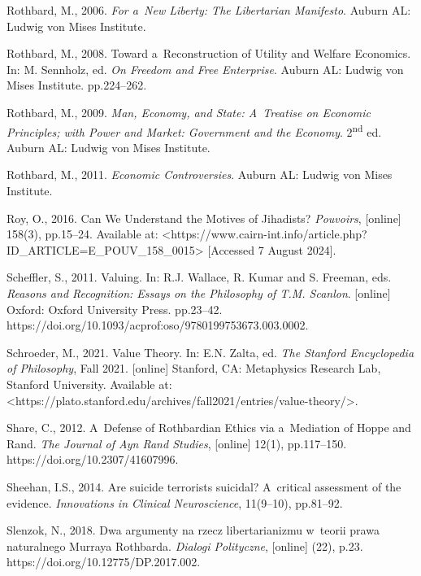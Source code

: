Rothbard, M., 2006. \textit{For a~New Liberty: The Libertarian Manifesto}. Auburn AL: Ludwig von Mises Institute.



Rothbard, M., 2008. Toward a~Reconstruction of Utility and Welfare Economics. In: M. Sennholz, ed. \textit{On Freedom and Free Enterprise}. Auburn AL: Ludwig von Mises Institute. pp.224–262.



Rothbard, M., 2009. \textit{Man, Economy, and State: A~Treatise on Economic Principles; with Power and Market: Government and the Economy}. 2\textsuperscript{nd} ed. Auburn AL: Ludwig von Mises Institute.



Rothbard, M., 2011. \textit{Economic Controversies}. Auburn AL: Ludwig von Mises Institute.



Roy, O., 2016. Can We Understand the Motives of Jihadists? \textit{Pouvoirs}, [online] 158(3), pp.15–24. Available at: {\textless}https://www.cairn-int.info/article.php?ID\_ARTICLE=E\_POUV\_158\_0015{\textgreater} [Accessed 7 August 2024].



Scheffler, S., 2011. Valuing. In: R.J. Wallace, R. Kumar and S. Freeman, eds. \textit{Reasons and Recognition: Essays on the Philosophy of T.M. Scanlon}. [online] Oxford: Oxford University Press. pp.23–42. https://doi.org/10.1093/acprof:oso/9780199753673.003.0002.



Schroeder, M., 2021. Value Theory. In: E.N. Zalta, ed. \textit{The Stanford Encyclopedia of Philosophy}, Fall 2021. [online] Stanford, CA: Metaphysics Research Lab, Stanford University. Available at: {\textless}https://plato.stanford.edu/archives/fall2021/entries/value-theory/{\textgreater}.



Share, C., 2012. A~Defense of Rothbardian Ethics via a~Mediation of Hoppe and Rand. \textit{The Journal of Ayn Rand Studies}, [online] 12(1), pp.117–150. https://doi.org/10.2307/41607996.



Sheehan, I.S., 2014. Are suicide terrorists suicidal? A~critical assessment of the evidence. \textit{Innovations in Clinical Neuroscience}, 11(9–10), pp.81–92.



Slenzok, N., 2018. Dwa argumenty na rzecz libertarianizmu w~teorii prawa naturalnego Murraya Rothbarda. \textit{Dialogi Polityczne}, [online] (22), p.23. https://doi.org/10.12775/DP.2017.002.



